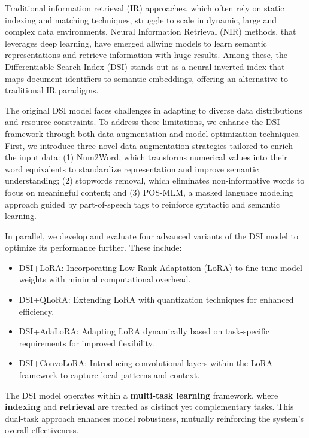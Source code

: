 Traditional information retrieval (IR) approaches, which often rely on static indexing and matching techniques, struggle to scale in dynamic, large and complex data environments. Neural Information Retrieval (NIR) methods, that leverages deep learning, have emerged allwing models to learn semantic representations and retrieve information with huge results. Among these, the Differentiable Search Index (DSI) stands out as a neural inverted index that maps document identifiers to semantic embeddings, offering an alternative to traditional IR paradigms.


The original DSI model faces challenges in adapting to diverse data distributions and resource constraints. To address these limitations, we enhance the DSI framework through both data augmentation and model optimization techniques. First, we introduce three novel data augmentation strategies tailored to enrich the input data: (1) Num2Word, which transforms numerical values into their word equivalents to standardize representation and improve semantic understanding; (2) stopwords removal, which eliminates non-informative words to focus on meaningful content; and (3) POS-MLM, a masked language modeling approach guided by part-of-speech tags to reinforce syntactic and semantic learning.

In parallel, we develop and evaluate four advanced variants of the DSI model to optimize its performance further. These include:
\begin{itemize}
    \item DSI+LoRA: Incorporating Low-Rank Adaptation (LoRA)\cite{hu2021loralowrankadaptationlarge} to fine-tune model weights with minimal computational overhead.
    \item DSI+QLoRA: Extending LoRA with quantization techniques \cite{dettmers2023qloraefficientfinetuningquantized} for enhanced efficiency.
    \item DSI+AdaLoRA: Adapting LoRA \cite{liu2024aloraallocatinglowrankadaptation} dynamically based on task-specific requirements for improved flexibility.
    \item DSI+ConvoLoRA: Introducing convolutional layers within the LoRA \cite{aleem2024convloraadabnbaseddomain} framework to capture local patterns and context.
\end{itemize}

The DSI model operates within a \textbf{multi-task learning} framework, where \textbf{indexing} and \textbf{retrieval} are treated as distinct yet complementary tasks. This dual-task approach enhances model robustness, mutually reinforcing the system's overall effectiveness.